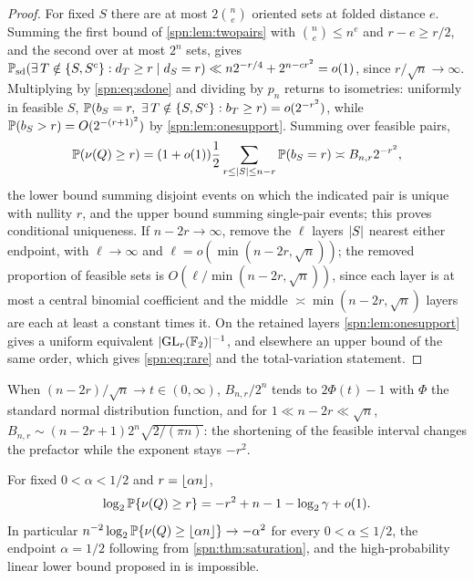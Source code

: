 \begin{proof}
For fixed $S$ there are at most $2\binom ne$ oriented sets at folded distance $e$. Summing the
first bound of \cref{spn:lem:twopairs} with $\binom ne\le n^e$ and $r-e\ge r/2$, and the second over
at most $2^n$ sets, gives
$\mathbb{P}_{\mathrm{sd}}(\exists\,T\notin\{S,S^c\}:d_T\ge r\mid d_S=r)\ll n2^{-r/4}+2^{n-cr^2}=o(1)$,
since $r/\sqrt n\to\infty$. Multiplying by \eqref{spn:eq:sdone} and dividing by $p_n$ returns to
isometries: uniformly in feasible $S$,
$\spnP(b_S=r,\ \exists\,T\notin\set{S,S^c}:b_T\ge r)=o(2^{-r^2})$, while
$\mathbb{P}(b_S>r)=O(2^{-(r+1)^2})$ by \cref{spn:lem:onesupport}. Summing over feasible pairs,
\begin{equation}\label{spn:eq:raresum}
 \mathbb{P}(\nu(Q)\ge r)=(1+o(1))\frac12\sum_{r\le\lvert S\rvert\le n-r}\mathbb{P}(b_S=r)\asymp B_{n,r}2^{-r^2},
\end{equation}
the lower bound summing disjoint events on which the indicated pair is unique with nullity $r$,
and the upper bound summing single-pair events; this proves conditional uniqueness. If
$n-2r\to\infty$, remove the $\ell$ layers $\lvert S\rvert$ nearest either endpoint, with $\ell\to\infty$
and $\ell=o(\min(n-2r,\sqrt n))$; the removed proportion of feasible sets is
$O(\ell/\min(n-2r,\sqrt n))$, since each layer is at most a central binomial coefficient and the
middle $\asymp\min(n-2r,\sqrt n)$ layers are each at least a constant times it. On the retained
layers \cref{spn:lem:onesupport} gives a uniform equivalent $\lvert\operatorname{GL}_r(\mathbb{F}_2)\rvert^{-1}$, and
elsewhere an upper bound of the same order, which gives \eqref{spn:eq:rare} and the
total-variation statement.
\end{proof}

When $(n-2r)/\sqrt n\to t\in(0,\infty)$, $B_{n,r}/2^n$ tends to $2\Phi(t)-1$ with $\Phi$ the
standard normal distribution function, and for $1\ll n-2r\ll\sqrt n$,
$B_{n,r}\sim(n-2r+1)2^n\sqrt{2/(\pi n)}$: the shortening of the feasible interval changes the
prefactor while the exponent stays $-r^2$.

\begin{corollary}\label{spn:cor:no-linear}
For fixed $0<\alpha<1/2$ and $r=\lfloor\alpha n\rfloor$,
\[
 \log_2\mathbb{P}\{\nu(Q)\ge r\}=-r^2+n-1-\log_2\gamma+o(1).
\]
In particular $n^{-2}\log_2\mathbb{P}\{\nu(Q)\ge\lfloor\alpha n\rfloor\}\to-\alpha^2$ for every
$0<\alpha\le1/2$, the endpoint $\alpha=1/2$ following from \cref{spn:thm:saturation}, and the
high-probability linear lower bound proposed in \cite{Vaas2026Principal} is impossible.
\end{corollary}

